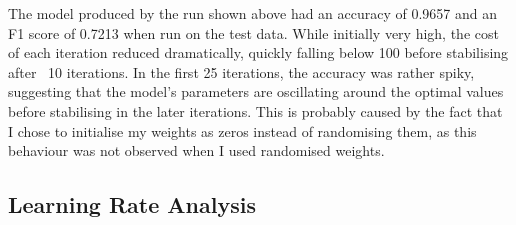 \documentclass[a4paper]{article}
\begin{document}
The model produced by the run shown above had an accuracy of 0.9657 and an F1 score of 0.7213 when run on the test data. While initially very high, the cost of each iteration reduced dramatically, quickly falling below 100 before stabilising after ~10 iterations. In the first 25 iterations, the accuracy was rather spiky, suggesting that the model's parameters are oscillating around the optimal values before stabilising in the later iterations. This is probably caused by the fact that I chose to initialise my weights as zeros instead of randomising them, as this behaviour was not observed when I used randomised weights.

\subsection{Learning Rate Analysis}
\end{document}
